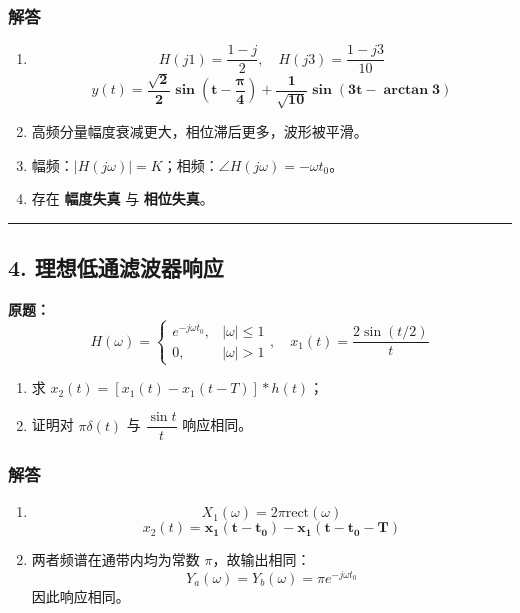 \subsubsection{解答}
\begin{enumerate}[label=(\arabic*)]
    \item
    \[
    H(j1)=\frac{1-j}{2},\quad H(j3)=\frac{1-j3}{10}
    \]
    \[
    y(t) = \boldsymbol{\frac{\sqrt{2}}{2}\sin\left(t-\frac{\pi}{4}\right) + \frac{1}{\sqrt{10}}\sin\left(3t-\arctan3\right)}
    \]

    \item 高频分量幅度衰减更大，相位滞后更多，波形被平滑。

    \item 幅频：$|H(j\omega)|=K$；相频：$\angle H(j\omega)=-\omega t_0$。

    \item 存在 \textbf{幅度失真} 与 \textbf{相位失真}。
\end{enumerate}

\vspace{1em}
\hrule
\vspace{1em}

\subsection{4. 理想低通滤波器响应}
\noindent\textbf{原题：}
\[
H(\omega)=\begin{cases}
e^{-j\omega t_0},&|\omega|\le1\\
0,&|\omega|>1
\end{cases},\quad
x_1(t)=\frac{2\sin(t/2)}{t}
\]
\begin{enumerate}[label=(\arabic*)]
    \item 求 $x_2(t)=\left[x_1(t)-x_1(t-T)\right]*h(t)$；
    \item 证明对 $\pi\delta(t)$ 与 $\dfrac{\sin t}{t}$ 响应相同。
\end{enumerate}

\subsubsection{解答}
\begin{enumerate}[label=(\arabic*)]
    \item
    \[
    X_1(\omega)=2\pi\mathrm{rect}(\omega)
    \]
    \[
    x_2(t) = \boldsymbol{x_1(t-t_0)-x_1(t-t_0-T)}
    \]

    \item
    两者频谱在通带内均为常数 $\pi$，故输出相同：
    \[
    Y_a(\omega)=Y_b(\omega)=\pi e^{-j\omega t_0}
    \]
    因此响应相同。
\end{enumerate}

